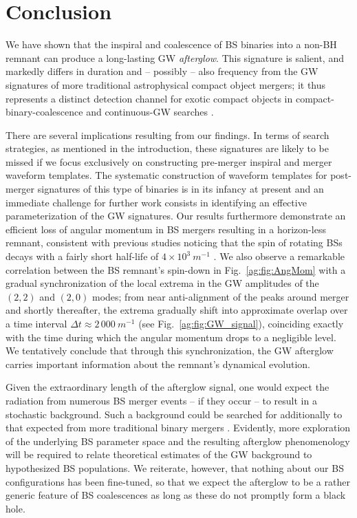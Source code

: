 \section{Conclusion}\label{ag:sec:conclusion}


We have shown that the inspiral and
coalescence of BS binaries into a non-BH remnant can produce a long-lasting GW {\it afterglow}. This signature is salient, and markedly differs in duration and -- possibly -- also
frequency from the GW signatures of more traditional astrophysical compact object mergers; it thus represents a distinct detection channel for exotic compact objects
in compact-binary-coalescence and continuous-GW searches \cite{LIGOScientific:2019yhl,KAGRA:2021una,LIGOScientific:2021jlr,LIGOScientific:2021oez,LIGOScientific:2022lsr,LIGOScientific:2022pjk,LIGOScientific:2021hvc,LIGOScientific:2021ozr}.

There are several implications resulting from our
findings. In terms of search strategies, as mentioned in the introduction, these signatures are likely to be missed if we focus exclusively on constructing pre-merger inspiral and merger waveform templates. The systematic construction of waveform templates for post-merger signatures of this type of binaries
is in its infancy at present and an immediate challenge
for further work consists in identifying an effective
parameterization of the GW signatures. Our results furthermore
demonstrate an efficient loss of angular momentum in BS mergers
resulting in a horizon-less remnant, consistent with previous studies noticing that the spin of rotating BSs decays with a fairly short half-life of $4\times 10^3~m^{-1}$ \cite{Sanchis-Gual:2019ljs}. We also observe
a remarkable correlation between the BS remnant's spin-down
in Fig.~\ref{ag:fig:AngMom} with a gradual synchronization
of the local extrema in the GW amplitudes of the $(2,2)$
and $(2,0)$ modes; from near anti-alignment of the
peaks around merger and shortly thereafter, the extrema
gradually shift into approximate overlap over a time
interval $\Delta t \approx 2\,000~m^{-1}$ (see
Fig.~\ref{ag:fig:GW_signal}), coinciding
exactly with the time during which the angular momentum
drops to a negligible level.
We tentatively conclude that through this synchronization,
the GW afterglow carries important information about the remnant's dynamical evolution. 

Given the extraordinary length of the afterglow signal, one
would expect the radiation from numerous BS merger events
-- if they occur -- to result in a stochastic background.
Such a background could be searched for additionally
to that expected from more traditional binary mergers
\cite{Croon:2018ftb}. Evidently, more exploration of the
underlying BS parameter space and the resulting afterglow
phenomenology will be required to relate theoretical
estimates of the GW background to hypothesized BS populations.
We reiterate, however, that nothing about our BS configurations
has been fine-tuned, so that we expect the afterglow to be a
rather generic feature of BS coalescences as long as these do 
not promptly form a black hole.


